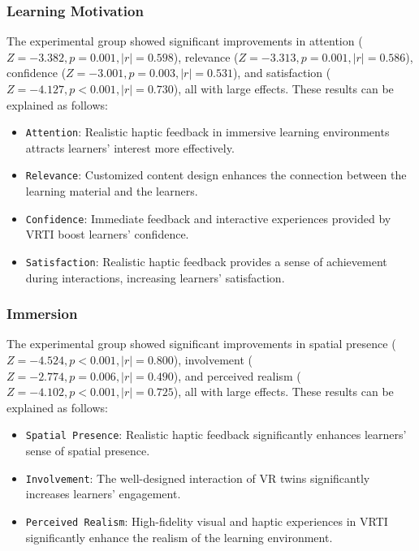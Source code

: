 \documentclass[sigconf,review,anonymous]{acmart}
\begin{document}
\subsubsection{Learning Motivation}
The experimental group showed significant improvements in attention ($Z=-3.382, p=0.001, |r|=0.598$), relevance ($Z=-3.313, p=0.001, |r|=0.586$), confidence ($Z=-3.001, p=0.003, |r|=0.531$), and satisfaction ($Z=-4.127, p<0.001, |r|=0.730$), all with large effects. These results can be explained as follows:

\begin{itemize}
  \item {\texttt{Attention}}: Realistic haptic feedback in immersive learning environments attracts learners' interest more effectively.

  \item {\texttt{Relevance}}: Customized content design enhances the connection between the learning material and the learners.

  \item {\texttt{Confidence}}: Immediate feedback and interactive experiences provided by VRTI boost learners' confidence.

  \item {\texttt{Satisfaction}}: Realistic haptic feedback provides a sense of achievement during interactions, increasing learners' satisfaction.
\end{itemize}

\subsubsection{Immersion}
The experimental group showed significant improvements in spatial presence ($Z=-4.524, p<0.001, |r|=0.800$), involvement ($Z=-2.774, p=0.006, |r|=0.490$), and perceived realism ($Z=-4.102, p<0.001, |r|=0.725$), all with large effects. These results can be explained as follows:

\begin{itemize}
  \item {\texttt{Spatial Presence}}: Realistic haptic feedback significantly enhances learners' sense of spatial presence.

  \item {\texttt{Involvement}}: The well-designed interaction of VR twins significantly increases learners' engagement.

  \item {\texttt{Perceived Realism}}: High-fidelity visual and haptic experiences in VRTI significantly enhance the realism of the learning environment.
\end{itemize}
\end{document}
